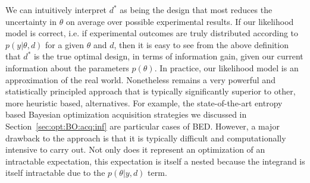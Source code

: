 We can intuitively interpret $d^*$ as being the design that most reduces the uncertainty in $\theta$
on average over possible experimental results.  If our likelihood model is correct, i.e. if experimental outcomes
are truly distributed according to $p(y | \theta, d)$ for a given $\theta$ and $d$, then it is easy to see 		
from the above definition that		
$d^*$ is the true optimal design, in terms of information gain, given our current information about		
the parameters $p\left(\theta \right)$.  		
In practice, our likelihood model is an approximation of		
the real world.
Nonetheless \Bad remains a very powerful and
statistically principled approach that is typically significantly superior to other, more heuristic based,
alternatives.  For example, the state-of-the-art entropy based Bayesian optimization acquisition strategies we 
discussed in Section~\ref{sec:opt:BO:acq:inf} are particular cases of BED.
However, a major drawback to the \Bad
approach is that it is typically difficult and computationally intensive to carry out.  
Not only does it represent an optimization 
of an intractable expectation, this expectation is itself a nested because
the integrand is itself intractable due to the $p\left(\theta | y, d\right)$ term.